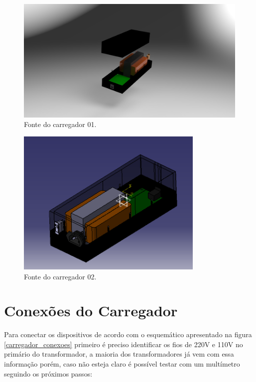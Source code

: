 \begin{figure}[H]
  \centering
  \includegraphics[width=\textwidth]{Figuras/untitled.8.jpg}
  \caption{Fonte do carregador 01.} 
  \label{carregador_cad2}
\end{figure}

\begin{figure}[H]
  \centering
  \includegraphics[width=0.8\textwidth]{Figuras/ISOCARREGADOR.PNG}
  \caption{Fonte do carregador 02.} 
  \label{carregador_cad3}
\end{figure}

\newpage

\section{Conexões do Carregador}

Para conectar os dispositivos de acordo com o esquemático apresentado na figura \ref{carregador_conexoes} primeiro é preciso identificar os fios de 220V e 110V no primário do transformador, a maioria dos transformadores já vem com essa informação porém, caso não esteja claro é possível testar com um multímetro seguindo os próximos passos:

